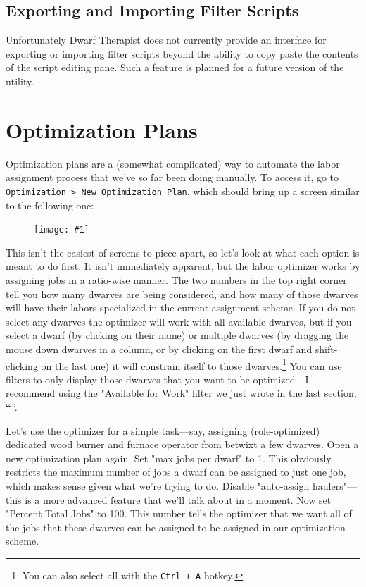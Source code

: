\documentclass[]{article}
\newcommand{\jump}[1] {\textbf{``\nameref{sec:#1}}''}
\newcommand{\legacy}[1] {
\begin{center}
\colorbox{legacy-content}{
\begin{minipage}[t]{0.95\linewidth}
#1
\end{minipage}
}
\end{center}
}
\newcommand{\fullfigure}[1] {
\begin{figure}[h!]
\texttt{[image: \#1]}
\end{figure}
}
\begin{document}
\subsection{Exporting and Importing Filter Scripts}
\label{sec:Exporting and Importing Filter Scripts}

Unfortunately Dwarf Therapist does not currently provide an interface for exporting or importing filter
scripts beyond the ability to copy paste the contents of the script editing pane. Such a feature is
planned for a future version of the utility.

\newpage
\section{Optimization Plans}
\label{sec:Optimization Plans}


Optimization plans are a (somewhat complicated) way to automate the labor assignment process that we've
so far been doing manually. To access it, go to \texttt{Optimization > New Optimization Plan}, which
should bring up a screen similar to the following one:

\fullfigure{Sec4Fig5}

This isn't the easiest of screens to piece apart, so let's look at what each option is meant to do first.
It isn't immediately apparent, but the labor optimizer works by assigning jobs in a ratio-wise manner.
The two numbers in the top right corner tell you how many dwarves are being considered, and how many of
those dwarves will have their labors specialized in the current assignment scheme. If you do not select
any dwarves the optimizer will work with all available dwarves, but if you select a dwarf (by clicking on
their name) or multiple dwarves (by dragging the mouse down dwarves in a column, or by clicking on
the first dwarf and shift-clicking on the last one) it will constrain itself to those
dwarves.\footnote{You can also select all with the \texttt{Ctrl + A} hotkey.} You can use filters to
only display those dwarves that you want to be optimized---I recommend using the "Available for Work"
filter we just wrote in the last section, \jump{Writing Complex Scripts}.

Let's use the optimizer for a simple task---say, assigning  (role-optimized) dedicated wood burner and
furnace operator from betwixt a few dwarves. Open a new optimization plan again. Set "max jobs per dwarf"
to 1. This obviously restricts the maximum number of jobs a dwarf can be assigned to just one job, which
makes sense given what we're trying to do. Disable "auto-assign haulers"---this is a more advanced
feature that we'll talk about in a moment. Now set "Percent Total Jobs" to 100. This number tells the
optimizer that we want all of the jobs that these dwarves can be assigned to be assigned in our
optimization scheme.
\end{document}
